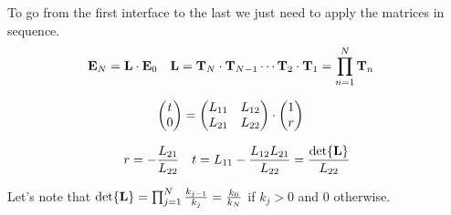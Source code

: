 
To go from the first interface to the last we just need to apply the matrices in sequence.
\begin{align*}
	\vb{E}_N & = \vb{L}\cdot\vb{E}_0 & \vb{L} & = \vb{T}_N\cdot\vb{T}_{N-1}\cdots\vb{T}_2\cdot\vb{T}_{1} = \prod_{n=1}^N \vb{T}_n
\end{align*}

\begin{align*}
	\pmqty{t \\ 0} &= \pmqty{L_{11} & L_{12}\\L_{21}&L_{22}}\cdot\pmqty{1\\r}
\end{align*}

\begin{align*}
	r & = -\frac{L_{21}}{L_{22}} & t = L_{11} - \frac{L_{12}L_{21}}{L_{22}}  = \frac{\det{\vb{L}}}{L_{22}}
\end{align*}

Let's note that $\det{\vb{L}} = \prod_{j=1}^N\frac{k_{j-1}}{k_{j}} = \frac{k_0}{k_N}$ if $k_j > 0$ and $0$ otherwise.





